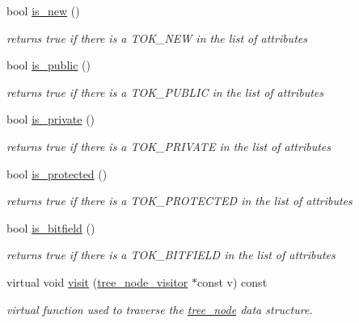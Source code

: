\begin{DoxyCompactItemize}
bool \hyperlink{structattr_a7550e00bb1589c45f04f2c302db58e4f}{is\+\_\+new} ()
\begin{DoxyCompactList}\small\item\em returns true if there is a T\+O\+K\+\_\+\+N\+EW in the list of attributes \end{DoxyCompactList}\item 
bool \hyperlink{structattr_a413e673300e8b18f23026cf752d22bed}{is\+\_\+public} ()
\begin{DoxyCompactList}\small\item\em returns true if there is a T\+O\+K\+\_\+\+P\+U\+B\+L\+IC in the list of attributes \end{DoxyCompactList}\item 
bool \hyperlink{structattr_ad63a36123b0f975d24acdab8651c2b70}{is\+\_\+private} ()
\begin{DoxyCompactList}\small\item\em returns true if there is a T\+O\+K\+\_\+\+P\+R\+I\+V\+A\+TE in the list of attributes \end{DoxyCompactList}\item 
bool \hyperlink{structattr_a9082e7e1db15a75b382be7a30590dc6a}{is\+\_\+protected} ()
\begin{DoxyCompactList}\small\item\em returns true if there is a T\+O\+K\+\_\+\+P\+R\+O\+T\+E\+C\+T\+ED in the list of attributes \end{DoxyCompactList}\item 
bool \hyperlink{structattr_a747c4d450ad4ebac8bb6c65326636d3a}{is\+\_\+bitfield} ()
\begin{DoxyCompactList}\small\item\em returns true if there is a T\+O\+K\+\_\+\+B\+I\+T\+F\+I\+E\+LD in the list of attributes \end{DoxyCompactList}\item 
virtual void \hyperlink{structattr_a75ba987f0d5d6b50e0aee15d25b98a5b}{visit} (\hyperlink{classtree__node__visitor}{tree\+\_\+node\+\_\+visitor} $\ast$const v) const
\begin{DoxyCompactList}\small\item\em virtual function used to traverse the \hyperlink{classtree__node}{tree\+\_\+node} data structure. \end{DoxyCompactList}\end{DoxyCompactItemize}

